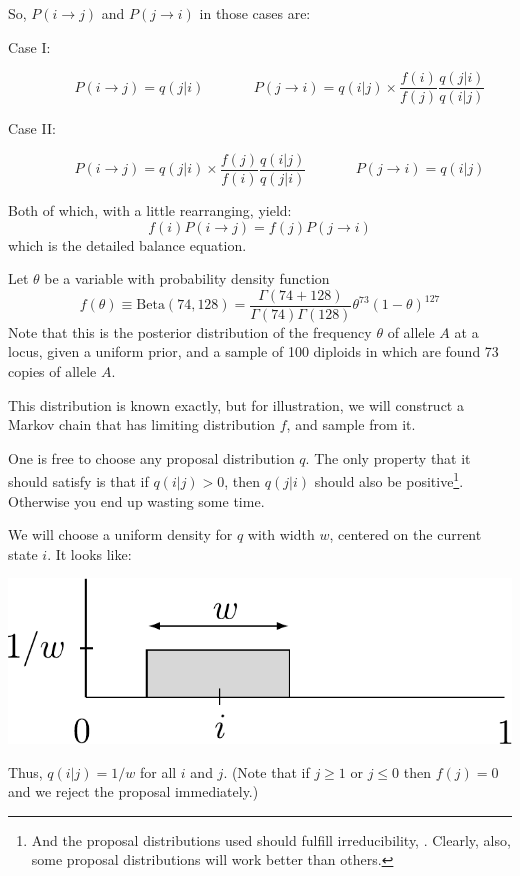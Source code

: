 
So, $P(i\rightarrow j)$ and $P(j\rightarrow i)$ in those cases are:
\begin{description}
\item[Case I:~~] 
\[
P(i\rightarrow j) = q(j|i)~~~~~~~~~~~~~~~~ P(j\rightarrow i) = q(i|j) \times \frac{f(i)}{f(j)} \frac{q(j|i)}{q(i|j)}
\]
\item[Case II:~~]
\[
P(i\rightarrow j) = q(j|i) \times \frac{f(j)}{f(i)} \frac{q(i|j)}{q(j|i)}
~~~~~~~~~~~~~~~~
P(j\rightarrow i) = q(i|j)
\]
\end{description}
Both of which, with a little rearranging, yield:
\[
f(i)P(i\rightarrow j) = f(j)P(j\rightarrow i)
\]
which is the detailed balance equation.

Let $\theta$ be a variable with probability density function
\[
	f(\theta)\equiv\mathrm{Beta}(74,128) = \frac{\Gamma(74+128)}
	{\Gamma(74)\Gamma(128)} \theta^{73} (1-\theta)^{127}
\]	
Note that this is the posterior distribution of the frequency $\theta$ of allele $A$ at a locus, given a uniform prior, and a sample of 100 diploids in which are found 73 copies of allele $A$.

This distribution is known exactly, but for illustration, we will construct a Markov chain that has limiting distribution $f$, and sample from it.

\enlargethispage*{1000pt}
One is free to choose any proposal distribution $q$.  The only property that it should satisfy is that if $q(i|j)>0$, then $q(j|i)$ should also be positive\footnote{And the proposal distributions used should fulfill irreducibility, \etc.  Clearly, also, some proposal distributions will work better than others. }.  Otherwise you end up wasting some time.  

We will choose a uniform density for $q$ with width $w$, centered on the current state $i$.  It looks like:
\begin{center}
\includegraphics[width=.6\textwidth]{illus/propdist.pdf}
\end{center}
Thus, $q(i|j) = 1/w$ for all $i$ and $j$. (Note that if $j\geq1$ or $j\leq0$ then $f(j)=0$ and we reject the proposal immediately.)  


